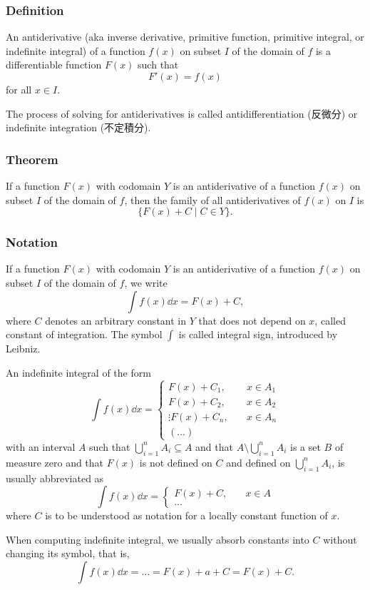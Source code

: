 \documentclass[a4paper,12pt]{report}
\begin{document}
\begin{itemize}
\begin{itemize}
\subsubsection{Definition}
An antiderivative (aka inverse derivative, primitive function, primitive integral, or indefinite integral) of a function $f(x)$ on subset $I$ of the domain of $f$ is a differentiable function $F(x)$ such that
\[F'(x)=f(x)\]
for all $x\in I$.

The process of solving for antiderivatives is called antidifferentiation (反微分) or indefinite integration (不定積分).
\subsubsection{Theorem}
If a function $F(x)$ with codomain $Y$ is an antiderivative of a function $f(x)$ on subset $I$ of the domain of $f$, then the family of all antiderivatives of $f(x)$ on $I$ is
\[\{F(x)+C\mid C\in Y\}.\]
\subsubsection{Notation}
If a function $F(x)$ with codomain $Y$ is an antiderivative of a function $f(x)$ on subset $I$ of the domain of $f$, we write
\[\int f(x)\dd{x}=F(x)+C,\]
where $C$ denotes an arbitrary constant in $Y$ that does not depend on $x$, called constant of integration. The symbol $\int$ is called integral sign, introduced by Leibniz.

An indefinite integral of the form
\[\int f(x)\dd{x}=
\begin{cases}
F(x)+C_1,\quad & x\in A_1\\
F(x)+C_2,\quad & x\in A_2\\
\vdots
F(x)+C_n,\quad & x\in A_n\\
(\ldots)
\end{cases}\]
with an interval $A$ such that $\bigcup_{i=1}^nA_i\subseteq A$ and that $A\setminus\bigcup_{i=1}^nA_i$ is a set $B$ of measure zero and that $F(x)$ is not defined on $C$ and defined on $\bigcup_{i=1}^nA_i$, is usually abbreviated as
\[\int f(x)\dd{x}=
\begin{cases}
F(x)+C,\quad & x\in A\\
\ldots
\end{cases}\]
where $C$ is to be understood as notation for a locally constant function of $x$.

When computing indefinite integral, we usually absorb constants into $C$ without changing its symbol, that is,
\[\int f(x)\dd{x}=\ldots=F(x)+a+C=F(x)+C.\]

\end{itemize}
\end{itemize}
\end{document}
